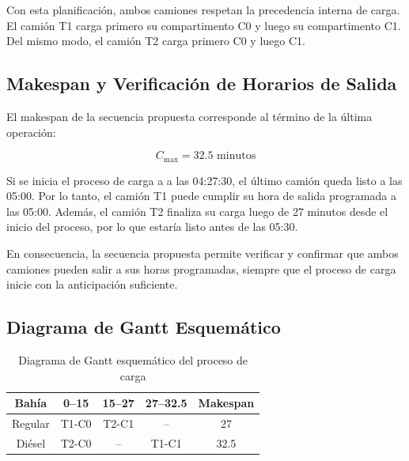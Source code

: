 Con esta planificación, ambos camiones respetan la precedencia interna de carga. El camión T1 carga primero su compartimento C0 y luego su compartimento C1. Del mismo modo, el camión T2 carga primero C0 y luego C1.

\subsection{Makespan y Verificación de Horarios de Salida}

El makespan de la secuencia propuesta corresponde al término de la última operación:

\begin{equation}
    C_{\max} = 32.5 \text{ minutos}
\end{equation}

Si se inicia el proceso de carga a a las 04:27:30, el último camión queda listo a las 05:00. Por lo tanto, el camión T1 puede cumplir su hora de salida programada a las 05:00. Además, el camión T2 finaliza su carga luego de 27 minutos desde el inicio del proceso, por lo que estaría listo antes de las 05:30.

En consecuencia, la secuencia propuesta permite verificar y confirmar que ambos camiones pueden salir a sus horas programadas, siempre que el proceso de carga inicie con la anticipación suficiente.


\subsection{Diagrama de Gantt Esquemático}

\begin{table}[H]
\centering
\caption{Diagrama de Gantt esquemático del proceso de carga}
\begin{tabular}{c|cccc}
\toprule
Bahía & 0--15 & 15--27 & 27--32.5 & Makespan \\
\midrule
Regular & T1-C0 & T2-C1 & -- & 27 \\
Diésel & T2-C0 & -- & T1-C1 & 32.5 \\
\bottomrule
\end{tabular}
\end{table}
